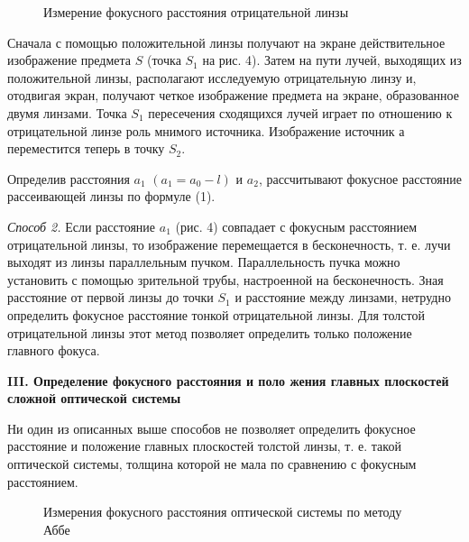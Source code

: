 \documentclass[14pt]{article}
\begin{document}
\begin{figure}[h!]
	\caption{Измерение фокусного расстояния отрицательной линзы}
	\label{fig:image}
\end{figure}

Сначала с помощью положительной
линзы получают на экране
действительное изображение предмета
$S$ (точка $S_1$ на рис. 4). Затем
на пути лучей, выходящих из положительной
линзы, располагают исследуемую
отрицательную линзу и,
отодвигая экран, получают четкое
изображение предмета на экране,
образованное двумя линзами.
Точка
$S_1$ пересечения сходящихся лучей играет по отношению
к отрицательной
линзе роль мнимого источника. Изображение источник
а переместится теперь в точку $S_2$.


Определив расстояния $a_1$ $(a_1 = a_0 − l)$ и
$a_2$, рассчитывают фокусное
расстояние рассеивающей линзы по формуле (1).

\textsl{Способ 2.} Если расстояние
$a_1$ (рис. 4) совпадает с фокусным расстоянием
отрицательной линзы, то изображение перемещается в бесконечность,
т. е. лучи выходят из линзы параллельным пучком.
Параллельность пучка можно
установить с помощью зрительной трубы,
настроенной на бесконечность. Зная расстояние от первой линзы до
точки
$S_1$ и расстояние между линзами, нетрудно определить фокусное
расстояние тонкой отрицательной линзы. Для толстой отрицательной
линзы этот метод позволяет определить только положение главного фокуса.

\vspace{1cm}
\textbf{III. Определение фокусного расстояния и поло
жения главных плоскостей
сложной оптической системы}

Ни один из описанных выше способов не позволяет определить фокусное
расстояние
и положение главных плоскостей толстой линзы, т. е.
такой оптической системы, толщина
которой не мала по сравнению с
фокусным расстоянием.

\begin{figure}[h!]
	\caption{Измерения фокусного расстояния оптической системы по методу Аббе}
	\label{fig:image}
\end{figure}
\end{document}
